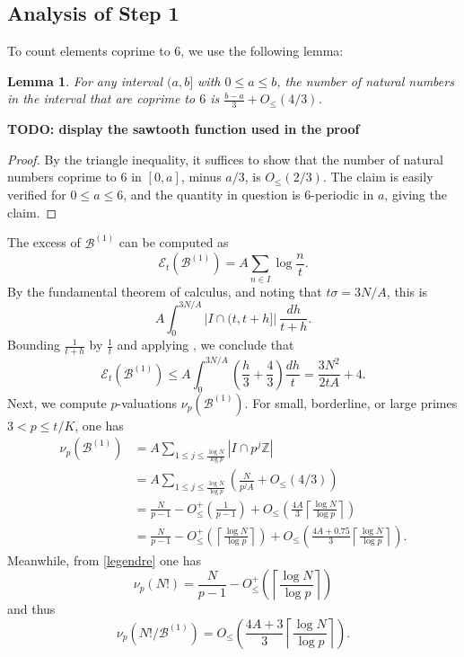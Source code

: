 \documentclass[12pt,a4paper,reqno]{amsart}
\numberwithin{equation}{section}
\theoremstyle{plain}
\newtheorem{lemma}[theorem]{Lemma}
\theoremstyle{definition}
\newcommand\Z{\mathbb{Z}}
\newcommand\tuple{{\mathcal B}}
\newcommand\excess{{\mathcal{E}}}
\begin{document}
\subsection{Analysis of Step 1}

To count elements coprime to $6$, we use the following lemma:

\begin{lemma}\label{lit}  For any interval $(a,b]$ with $0 \leq a \leq b$, the number of natural numbers in the interval that are coprime to $6$ is $\frac{b-a}{3} + O_{\leq}(4/3)$.
\end{lemma}

{\bf TODO: display the sawtooth function used in the proof}

\begin{proof}  By the triangle inequality, it suffices to show that the number of natural numbers coprime to $6$ in $[0,a]$, minus $a/3$, is $O_{\leq}(2/3)$.  The claim is easily verified for $0 \leq a \leq 6$, and the quantity in question is $6$-periodic in $a$, giving the claim.
\end{proof}

The excess of $\tuple^{(1)}$ can be computed as
$$ \excess_t(\tuple^{(1)}) = A \sum_{n \in I} \log \frac{n}{t}.$$
By the fundamental theorem of calculus, and noting that $t\sigma = 3N/A$, this is
$$ A \int_0^{3N/A} |I \cap (t, t+h]|\ \frac{dh}{t+h}.$$
Bounding $\frac{1}{t+h}$ by $\frac{1}{t}$ and applying , we conclude that
\begin{equation}\label{excess1-bound}
 \excess_t(\tuple^{(1)}) \leq A \int_0^{3N/A} \left(\frac{h}{3} + \frac{4}{3}\right) \frac{dh}{t} = \frac{3N^2}{2tA} + 4.
\end{equation}
Next, we compute $p$-valuations $\nu_p(\tuple^{(1)})$.  For small, borderline, or large primes $3 < p \leq t/K$, one has
\begin{align*}
  \nu_p(\tuple^{(1)}) &= A \sum_{1 \leq j \leq \frac{\log N}{\log p}} |I \cap p^j \Z| \\
  &= A \sum_{1 \leq j \leq \frac{\log N}{\log p}} \left(\frac{N}{p^j A} + O_{\leq}(4/3)\right) \\
  &= \frac{N}{p-1} - O_{\leq}^+\left(\frac{1}{p-1}\right)
  + O_{\leq}\left(\frac{4A}{3} \left\lceil \frac{\log N}{\log p}  \right\rceil\right) \\
  &= \frac{N}{p-1} 
  - O_{\leq}^+\left(\left\lceil \frac{\log N}{\log p}  \right\rceil\right)
  + O_{\leq}\left(\frac{4A+0.75}{3} \left\lceil \frac{\log N}{\log p}  \right\rceil\right).
\end{align*}
Meanwhile, from \eqref{legendre} one has
$$ \nu_p(N!) = \frac{N}{p-1} - O_{\leq}^+\left(\left\lceil \frac{\log N}{\log p}  \right\rceil\right)$$
and thus
\begin{equation}\label{nup} 
  \nu_p(N!/\tuple^{(1)}) =  
O_{\leq}\left(\frac{4A+3}{3} \left\lceil \frac{\log N}{\log p}  \right\rceil\right).
\end{equation}
\end{document}

